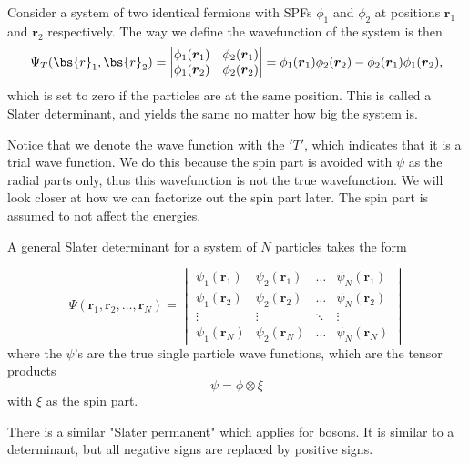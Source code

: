 Consider a system of two identical fermions with SPFs $\phi_1$ and $\phi_2$ at positions $\boldsymbol{r}_1$ and $\boldsymbol{r}_2$ respectively. The way we define the wavefunction of the system is then
\begin{equation}
\Psi_T(\bs{r}_1,\bs{r}_2)=
\begin{vmatrix}
\phi_1(\boldsymbol{r}_1) & \phi_2(\boldsymbol{r}_1)\\
\phi_1(\boldsymbol{r}_2) & \phi_2(\boldsymbol{r}_2)
\end{vmatrix}
=\phi_1(\boldsymbol{r}_1)\phi_2(\boldsymbol{r}_2)-\phi_2(\boldsymbol{r}_1)\phi_1(\boldsymbol{r}_2),
\end{equation}
which is set to zero if the particles are at the same position. This is called a Slater determinant, and yields the same no matter how big the system is.

Notice that we denote the wave function with the $'T'$, which indicates that it is a trial wave function. We do this because the spin part is avoided with $\psi$ as the radial parts only, thus this wavefunction is not the true wavefunction. We will look closer at how we can factorize out the spin part later. The spin part is assumed to not affect the energies.

A general Slater determinant for a system of $N$ particles takes the form

\begin{equation}
\Psi(\boldsymbol{r}_1,\boldsymbol{r}_2,\hdots,\boldsymbol{r}_N)=
\begin{vmatrix}
\psi_1(\boldsymbol{r}_1) & \psi_2(\boldsymbol{r}_1) & \hdots & \psi_N(\boldsymbol{r}_1)\\
\psi_1(\boldsymbol{r}_2) & \psi_2(\boldsymbol{r}_2) & \hdots & \psi_N(\boldsymbol{r}_2)\\
\vdots & \vdots & \ddots & \vdots \\
\psi_1(\boldsymbol{r}_N) & \psi_2(\boldsymbol{r}_N) & \hdots & \psi_N(\boldsymbol{r}_N)
\end{vmatrix}
\end{equation}
where the $\psi$'s are the true single particle wave functions, which are the tensor products 
\begin{equation}
\psi=\phi\otimes\xi
\end{equation}
with $\xi$ as the spin part. 

There is a similar "Slater permanent" which applies for bosons. It is similar to a determinant, but all negative signs are replaced by positive signs. 

